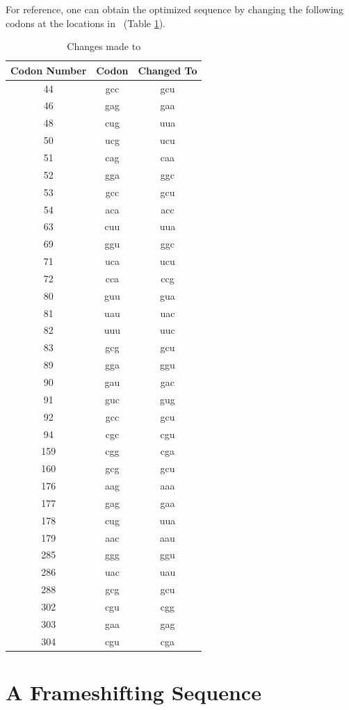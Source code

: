 \documentclass[10pt,twocolumn]{article}
\begin{document}
For reference, one can obtain the optimized sequence by changing the following codons
at the locations in \rpoS\ (Table \ref{rpos:changes}).
\begin{table}
\caption{Changes made to \rpoS}
\label{rpos:changes}
\begin{tabular}{ccc}
  \toprule
  Codon Number & Codon & Changed To\\
  \midrule
  44 & gcc & gcu\\
  46 & gag & gaa\\
  48 & cug & uua\\
  50 & ucg & ucu\\
  51 & cag & caa\\
  52 & gga & ggc\\
  53 & gcc & gcu\\
  54 & aca & acc\\
  63 & cuu & uua\\
  69 & ggu & ggc\\
  71 & uca & ucu\\
  72 & cca & ccg\\
  80 & guu & gua\\
  81 & uau & uac\\
  82 & uuu & uuc\\
  83 & gcg & gcu\\
  89 & gga & ggu\\
  90 & gau & gac\\
  91 & guc & gug\\
  92 & gcc & gcu\\
  94 & cgc & cgu\\
  159 & cgg & cga\\
  160 & gcg & gcu\\
  176 & aag & aaa\\
  177 & gag & gaa\\
  178 & cug & uua\\
  179 & aac & aau\\
  285 & ggg & ggu\\
  286 & uac & uau\\
  288 & gcg & gcu\\
  302 & cgu & cgg\\
  303 & gaa & gag\\
  304 & cgu & cga\\
  \bottomrule
\end{tabular}
\end{table}


\section{A Frameshifting Sequence}
\end{document}
